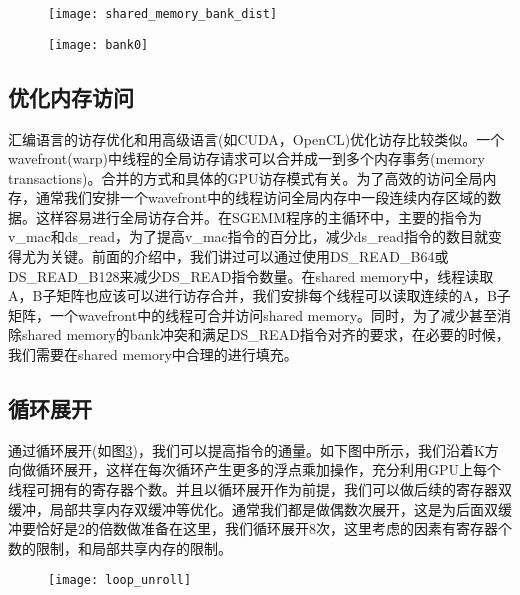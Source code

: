

\begin{figure}[htbp]
	\centering
	\texttt{[image: shared\_memory\_bank\_dist]}
	\label{fig:shared_memory_bank_dist}
\end{figure}

\begin{figure}[htbp]
	\centering
	\texttt{[image: bank0]}
	\label{fig:bank0}
\end{figure}

\subsection{优化内存访问}
汇编语言的访存优化和用高级语言(如CUDA，OpenCL)优化访存比较类似。一个wavefront(warp)中线程的全局访存请求可以合并成一到多个内存事务(memory transactions)。合并的方式和具体的GPU访存模式有关。为了高效的访问全局内存，通常我们安排一个wavefront中的线程访问全局内存中一段连续内存区域的数据。这样容易进行全局访存合并。在SGEMM程序的主循环中，主要的指令为v\_mac和ds\_read，为了提高v\_mac指令的百分比，减少ds\_read指令的数目就变得尤为关键。前面的介绍中，我们讲过可以通过使用DS\_READ\_B64或DS\_READ\_B128来减少DS\_READ指令数量。在shared memory中，线程读取A，B子矩阵也应该可以进行访存合并，我们安排每个线程可以读取连续的A，B子矩阵，一个wavefront中的线程可合并访问shared memory。同时，为了减少甚至消除shared memory的bank冲突和满足DS\_READ指令对齐的要求，在必要的时候，我们需要在shared memory中合理的进行填充。


\subsection{循环展开}
通过循环展开(如图\ref{fig:loop_unroll})，我们可以提高指令的通量。如下图中所示，我们沿着K方向做循环展开，这样在每次循环产生更多的浮点乘加操作，充分利用GPU上每个线程可拥有的寄存器个数。并且以循环展开作为前提，我们可以做后续的寄存器双缓冲，局部共享内存双缓冲等优化。通常我们都是做偶数次展开，这是为后面双缓冲要恰好是2的倍数做准备在这里，我们循环展开8次，这里考虑的因素有寄存器个数的限制，和局部共享内存的限制。

\begin{figure}[htbp]
	\centering
	\texttt{[image: loop\_unroll]}
	\label{fig:loop_unroll}
\end{figure}

